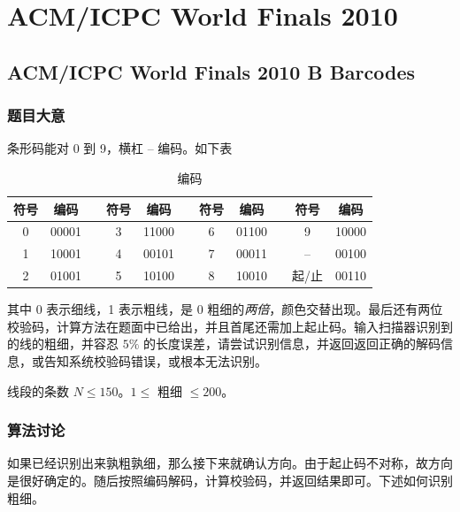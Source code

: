 
	\section{ACM/ICPC World Finals 2010}
		\subsection{ACM/ICPC World Finals 2010 B Barcodes}
			\subsubsection{题目大意}
				条形码能对 0 到 9，横杠 – 编码。如下表
				\begin{table}[!htb]
					\centering
					\begin{tabular}{ccccccccccc}
						\toprule
							符号 & 编码&&符号 & 编码 && 符号 & 编码&&符号 & 编码   \\
						\midrule
							0 & 00001 && 3 & 11000 && 6 & 01100 & & 9 & 10000 \\
							1 & 10001 && 4 & 00101 && 7 & 00011 && – & 00100 \\
							2 & 01001 && 5 & 10100 && 8 & 10010 && 起/止 & 00110 \\
						\bottomrule
					\end{tabular}
					\caption{编码}
				\end{table}
				
				其中 0 表示细线，1 表示粗线，是 0 粗细的\emph{两倍}，颜色交替出现。最后还有两位校验码，计算方法在题面中已给出，并且首尾还需加上起止码。输入扫描器识别到的线的粗细，并容忍 $5 \%$ 的长度误差，请尝试识别信息，并返回返回正确的解码信息，或告知系统校验码错误，或根本无法识别。
				
				线段的条数 $N \le 150$。$1 \le $ 粗细 $ \le 200$。

			\subsubsection{算法讨论}
				如果已经识别出来孰粗孰细，那么接下来就确认方向。由于起止码不对称，故方向是很好确定的。随后按照编码解码，计算校验码，并返回结果即可。下述如何识别粗细。
				
